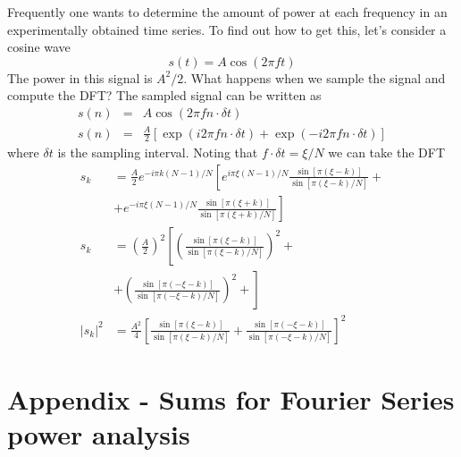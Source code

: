 \documentclass[twocolumn]{article}
\begin{document}
Frequently one wants to determine the amount of power at each frequency
in an experimentally obtained time series. To find out how to get
this, let's consider a cosine wave\[
s(t)=A\cos\left(2\pi ft\right)\]
 The power in this signal is $A^{2}/2$. What happens when we sample
the signal and compute the DFT? The sampled signal can be written
as\begin{eqnarray*}
s(n) & = & A\cos\left(2\pi fn\cdot\delta t\right)\\
s(n) & = & \frac{A}{2}\left[\exp\left(i2\pi fn\cdot\delta t\right)+\exp\left(-i2\pi fn\cdot\delta t\right)\right]\end{eqnarray*}
 where $\delta t$ is the sampling interval. Noting that $f\cdot\delta t=\xi/N$
we can take the DFT\begin{align*}
s_{k} & = \frac{A}{2}e^{-i\pi k(N-1)/N}\left[e^{i\pi\xi(N-1)/N}\frac{\sin\left[\pi\left(\xi-k\right)\right]}{\sin\left[\pi\left(\xi-k\right)/N\right]}+\right.\\
 & + \left.e^{-i\pi\xi(N-1)/N}\frac{\sin\left[\pi\left(\xi+k\right)\right]}{\sin\left[\pi\left(\xi+k\right)/N\right]}\right]\\
s_{k} & = \left(\frac{A}{2}\right)^{2}\left[\left(\frac{\sin\left[\pi\left(\xi-k\right)\right]}{\sin\left[\pi\left(\xi-k\right)/N\right]}\right)^{2}+\right.\\
 & + \left.\left(\frac{\sin\left[\pi\left(-\xi-k\right)\right]}{\sin\left[\pi\left(-\xi-k\right)/N\right]}\right)^{2}+\right]\\
|s_{k}|^{2} & = \frac{A^{2}}{4}\left[\frac{\sin\left[\pi\left(\xi-k\right)\right]}{\sin\left[\pi\left(\xi-k\right)/N\right]}+\frac{\sin\left[\pi\left(-\xi-k\right)\right]}{\sin\left[\pi\left(-\xi-k\right)/N\right]}\right]^{2}
\end{align*}



\section{Appendix - Sums for Fourier Series power analysis}
\end{document}

